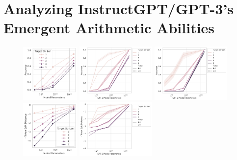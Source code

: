 \section{Analyzing InstructGPT/GPT-3's Emergent Arithmetic Abilities}

\begin{figure}
    \centering
    \includegraphics[width=0.26\textwidth]{figures/toy_emergence/acc_many_vs_model_size_by_target_str_len.pdf}%
    \includegraphics[width=0.35\textwidth]{figures/gpt3_integer_multiplication/multiplication_acc_vs_model_size_by_temp_by_target_str_len.pdf}%
    \includegraphics[width=0.35\textwidth]{figures/gpt3_integer_addition/addition_acc_vs_model_size_by_temp_by_target_str_len.pdf}
    \includegraphics[width=0.26\textwidth]{figures/toy_emergence/neg_token_edit_dist_many_vs_model_size_by_target_str_len.pdf}%
    \includegraphics[width=0.35\textwidth]{figures/gpt3_integer_multiplication/multiplication_neg_token_edit_dist_vs_model_size_by_temp_by_target_str_len.pdf}%

\end{figure}
